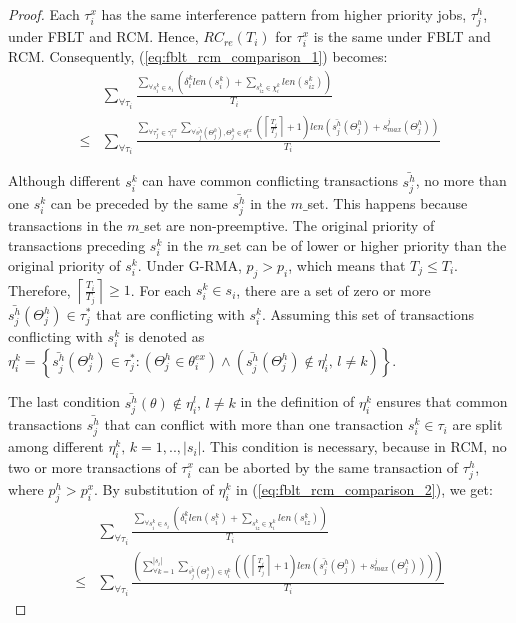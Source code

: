 \documentclass[prodmode,acmtecs]{acmsmall}
\begin{document}
\begin{proof}
Each $\tau_i^x$ has the same interference pattern from higher priority jobs, $\tau_j^h$, under FBLT and RCM. Hence, $RC_{re}(T_i)$ for $\tau_i^x$ is the same under FBLT and RCM. Consequently, (\ref{eq:fblt_rcm_comparison_1}) becomes:
\begin{eqnarray}
 & \sum_{\forall\tau_{i}}\frac{\sum_{\forall s_{i}^{k}\in s_{i}}\left(\delta_i^klen(s_{i}^{k})+\sum_{s_{iz}^k\in \chi_i^k} len(s_{iz}^{k})\right)}{T_{i}}\label{eq:fblt_rcm_comparison_2}\\
\le & \sum_{\forall\tau_{i}}\frac{\sum_{\forall\tau_{j}^{*}\in\gamma_{i}^{ex}}\sum_{\forall \bar{s_j^h}(\Theta_j^h),\Theta_j^h \in\theta_{i}^{ex}}\left(\left\lceil \frac{T_{i}}{T_{j}}\right\rceil +1\right)len\left(\bar{s_{j}^{h}}(\Theta_j^h)+s_{max}^{j}(\Theta_j^h)\right)}{T_{i}}\nonumber 
\end{eqnarray}


Although different $s_{i}^{k}$ 
can have common conflicting transactions
$\bar{s_{j}^{h}}$, no more than one $s_{i}^{k}$ can be preceded
by the same $\bar{s_{j}^{h}}$ in the $m\_$set. This happens because
transactions in the $m\_$set are non-preemptive. 
%
The original priority of transactions preceding $s_{i}^{k}$ in the $m\_$set can be of
lower or higher priority than the original priority of $s_{i}^{k}$. Under
G-RMA, $p_{j}>p_{i}$, which means that $T_{j}\le T_{i}$. Therefore, $\left\lceil \frac{T_{i}}{T_{j}}\right\rceil \ge1$.
For each $s_{i}^{k}\in s_{i}$, there are a set of zero or more $\bar{s_{j}^{h}}(\Theta_j^h)\in\tau_{j}^{*}$
that are conflicting with $s_{i}^{k}$. Assuming this set of 
transactions conflicting with $s_{i}^{k}$ is denoted as $\eta_{i}^{k}=\left\{ \bar{s_{j}^{h}}(\Theta_j^h)\in\tau_{j}^{*}:\left(\Theta_j^h\in\theta_{i}^{ex}\right)\wedge\left(\bar{s_{j}^{h}}(\Theta_j^h)\not\in\eta_{i}^{l},\, l\ne k\right)\right\} $.


The last condition $\bar{s_{j}^{h}}(\theta)\not\in\eta_{i}^{l},\, l\ne k$
in the definition of $\eta_{i}^{k}$ ensures that common transactions $\bar{s_{j}^{h}}$
that can conflict with more than one transaction $s_{i}^{k}\in\tau_{i}$
are split among different $\eta_{i}^{k},\, k=1,..,|s_{i}|$. This
condition is necessary, because in RCM, no two or more transactions
of $\tau_{i}^{x}$ can be aborted by the same transaction of $\tau_{j}^{h}$, 
where $p_{j}^{h}>p_{i}^{x}$. By substitution of $\eta_{i}^{k}$ in
(\ref{eq:fblt_rcm_comparison_2}), we get: 
\begin{eqnarray}
 & \sum_{\forall\tau_{i}}\frac{\sum_{\forall s_{i}^{k}\in s_{i}}\left(\delta_i^klen(s_{i}^{k})+\sum_{s_{iz}^k\in \chi_i^k} len(s_{iz}^{k})\right)}{T_{i}}\label{eq:fblt_rcm_comparison_4}\\
\le & \sum_{\forall\tau_{i}}\frac{\left(\sum_{\forall k=1}^{|s_{i}|}\sum_{\bar{s_{j}^{h}}(\Theta_j^h)\in\eta_{i}^{k}}\left(\left(\left\lceil \frac{T_{i}}{T_{j}}\right\rceil +1\right)len\left(\bar{s_{j}^{h}}(\Theta_j^h)+s_{max}^{j}(\Theta_j^h)\right)\right)\right)}{T_{i}}\nonumber 
\end{eqnarray}



\end{proof}
\end{document}
